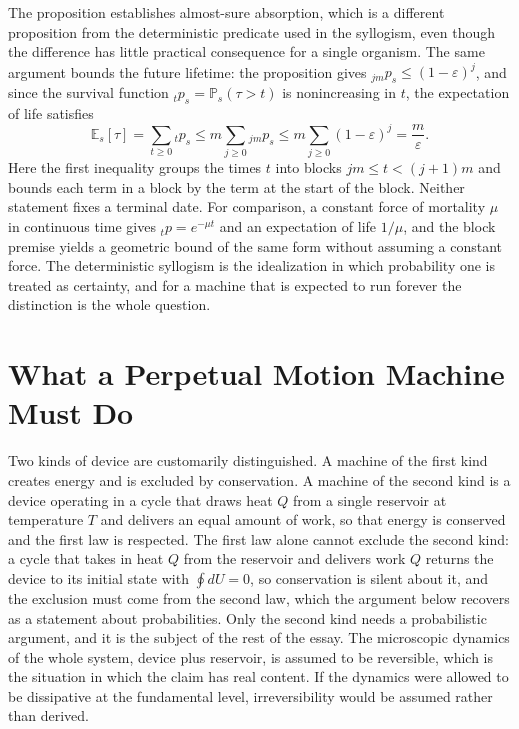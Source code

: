 \documentclass[11pt]{article}
\theoremstyle{definition}
\theoremstyle{remark}
\newcommand{\E}{\mathbb{E}}
\renewcommand{\Pr}{\mathbb{P}}
\begin{document}
The proposition establishes almost-sure absorption, which is a different proposition from the deterministic predicate used in the syllogism, even though the difference has little practical consequence for a single organism. The same argument bounds the future lifetime: the proposition gives ${}_{jm}p_{s} \le (1-\varepsilon)^{j}$, and since the survival function ${}_{t}p_{s} = \Pr_s(\tau > t)$ is nonincreasing in $t$, the expectation of life satisfies
\[
\E_s[\tau] = \sum_{t \ge 0} {}_{t}p_{s} \le m \sum_{j \ge 0} {}_{jm}p_{s} \le m \sum_{j \ge 0} (1-\varepsilon)^{j} = \frac{m}{\varepsilon}.
\]
Here the first inequality groups the times $t$ into blocks $jm \le t < (j+1)m$ and bounds each term in a block by the term at the start of the block. Neither statement fixes a terminal date. For comparison, a constant force of mortality $\mu$ in continuous time gives ${}_{t}p = e^{-\mu t}$ and an expectation of life $1/\mu$, and the block premise yields a geometric bound of the same form without assuming a constant force. The deterministic syllogism is the idealization in which probability one is treated as certainty, and for a machine that is expected to run forever the distinction is the whole question.

\section{What a Perpetual Motion Machine Must Do}

Two kinds of device are customarily distinguished. A machine of the first kind creates energy and is excluded by conservation. A machine of the second kind is a device operating in a cycle that draws heat $Q$ from a single reservoir at temperature $T$ and delivers an equal amount of work, so that energy is conserved and the first law is respected. The first law alone cannot exclude the second kind: a cycle that takes in heat $Q$ from the reservoir and delivers work $Q$ returns the device to its initial state with $\oint dU = 0$, so conservation is silent about it, and the exclusion must come from the second law, which the argument below recovers as a statement about probabilities. Only the second kind needs a probabilistic argument, and it is the subject of the rest of the essay. The microscopic dynamics of the whole system, device plus reservoir, is assumed to be reversible, which is the situation in which the claim has real content. If the dynamics were allowed to be dissipative at the fundamental level, irreversibility would be assumed rather than derived.
\end{document}
